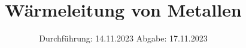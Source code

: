 


\subject{V204}
\title{Wärmeleitung von Metallen}
\date{%
  Durchführung: 14.11.2023
  \hspace{3em}
  Abgabe: 17.11.2023
}



\maketitle
\thispagestyle{empty}
\tableofcontents
\newpage




%

\printbibliography{}


